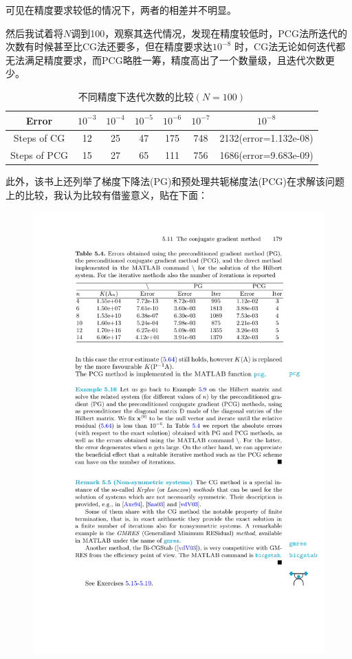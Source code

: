 可见在精度要求较低的情况下，两者的相差并不明显。

然后我试着将$N$调到100，观察其迭代情况，发现在精度较低时，PCG法所迭代的次数有时候甚至比CG法还要多，但在精度要求达$10^{-8}$ 时，CG法无论如何迭代都无法满足精度要求，而PCG略胜一筹，精度高出了一个数量级，且迭代次数更少。

\begin{table}[htbp]
  \centering
  \caption{不同精度下迭代次数的比较$(N=100)$}
    \begin{tabular}{ccccccc}
\toprule
{Error} &		$10^{-3}$	&		$10^{-4}$		&		$10^{-5}$		&$10^{-6}$		&		$10^{-7}$		& 	$10^{-8}$ \\
	\midrule
{Steps of CG}&12&	25&	47&175&748  & 2132(error=1.132e-08)  \\
{Steps of PCG}&15&	27&	65&111&756   & 1686(error=9.683e-09)\\
\bottomrule
    \end{tabular}
\end{table}


此外，该书上还列举了梯度下降法(PG)和预处理共轭梯度法(PCG)在求解该问题上的比较，我认为比较有借鉴意义，贴在下面：
\begin{figure}[H]
\centering
\includegraphics[width=12.5cm]{fig/5_6.pdf}
\end{figure}

